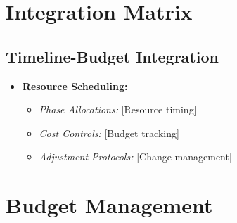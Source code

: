 \documentclass{article}
\begin{document}
\section{Integration Matrix}
\subsection{Timeline-Budget Integration}
\begin{itemize}
    \item \textbf{Resource Scheduling:}
    \begin{itemize}
        \item \textit{Phase Allocations:} [Resource timing]
        \item \textit{Cost Controls:} [Budget tracking]
        \item \textit{Adjustment Protocols:} [Change management]
    \end{itemize}
\end{itemize}
\section{Budget Management}
\end{document}
